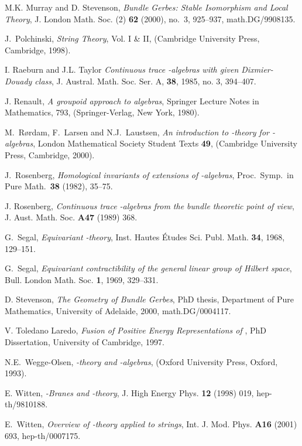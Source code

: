 \documentclass[a4paper,reqno]{amsart}
\theoremstyle{plain}
\theoremstyle{definition}
\theoremstyle{remark}
\numberwithin{equation}{section}
\numberwithin{figure}{section}
\providecommand{\<}{\langle}
\renewcommand{\>}{\rangle}
\begin{document}
\begin{thebibliography}{99}
M.K. Murray and D. Stevenson, {\it Bundle Gerbes: Stable
Isomorphism and Local Theory}, J. London Math. Soc. (2) {\bf 62}
(2000), no.~3, 925--937, math.DG/9908135.

J.~Polchinski, {\it String Theory}, Vol. I \& II,
(Cambridge University Press, Cambridge, 1998).

I. Raeburn and J.L. Taylor
{\sl Continuous trace \coordHE{}-algebras with given Dixmier-Douady class},
J. Austral. Math. Soc. Ser. A, {\bf 38}, 1985, no. 3,
394--407.

J. Renault, {\em A groupoid approach to \coordHE{} algebras},
Springer Lecture Notes in Mathematics, 793, (Springer-Verlag, New York,
1980).


M.~R\o rdam, F.~Larsen and N.J.~Laustsen, {\it An introduction
to \coordHE{}-theory for \coordHE{}-algebras},
London Mathematical Society Student Texts {\bf 49}, (Cambridge
University Press, Cambridge, 2000).


J.~Rosenberg, {\it Homological invariants of extensions of
\coordHE{}-algebras}, Proc.\ Symp.\ in Pure Math.\ {\bf 38} (1982), 35--75.


J. Rosenberg, {\it Continuous trace \coordHE{}-algebras from
the bundle theoretic point of view},
J. Aust. Math. Soc. {\bf A47} (1989) 368.

G.~Segal, {\it Equivariant \coordHE{}-theory},
Inst. Hautes \'Etudes Sci. Publ. Math.
{\bf 34}, 1968, 129--151.

G.~Segal,
{\it Equivariant contractibility of the general linear group of
               Hilbert space}, Bull. London Math. Soc.
   {\bf 1}, 1969, 329--331.

D. Stevenson,
{\it The Geometry of Bundle Gerbes},
PhD thesis, Department of Pure Mathematics, University of Adelaide, 2000,
math.DG/0004117.

V. Toledano Laredo, {\it Fusion of Positive Energy Representations 
of \coordHE{}}, PhD Dissertation, University of Cambridge, 1997. 

N.E.~Wegge-Olsen, {\it {}\coordHE{}-theory and \coordHE{}-algebras},
(Oxford University Press, Oxford, 1993).

E. Witten,
{\it {}\coordHE{}-Branes and \coordHE{}-theory},
J. High Energy Phys. {\bf 12} (1998) 019, hep-th/9810188.

E.~Witten,
{\it Overview of \coordHE{}-theory applied to strings},
Int. J. Mod. Phys. {\bf A16} (2001) 693, hep-th/0007175.

\end{thebibliography}
\end{document}
